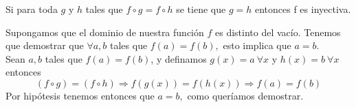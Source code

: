 \begin{isabellebody}
\begin{isamarkuptext}
\begin {lema} 
Si para toda $g$ y $h$ tales que $f \circ g =  f \circ h$ se tiene que $g
= h$ entonces f es inyectiva.
\end {lema} 

\begin {demostracion}


Supongamos que el dominio de nuestra función $f$ es distinto del vacío.
Tenemos que demostrar que $\forall a,b$ tales que $f(a) = f(b),$ esto
 implica que $a = b.$ \\
Sean $a,b$ tales que $f(a) = f(b)$, y definamos $g(x) = a  \ \forall x$
 y $h(x) = b \  \forall x$ entonces 
$$(f \circ g) = (f \circ h) \Longrightarrow  f(g(x)) = f(h(x)) \Longrightarrow f(a) = f(b)$$
Por hipótesis tenemos entonces que $a = b,$ como queríamos demostrar.
\end {demostracion}



\end{isamarkuptext}
\end{isabellebody}
